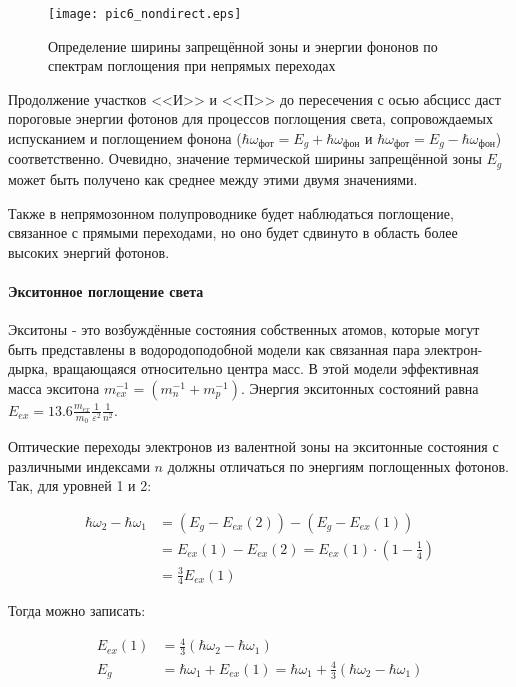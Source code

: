 \begin{figure}[h!]\centering
\texttt{[image: pic6\_nondirect.eps]}
\caption{Определение ширины запрещённой зоны и энергии фононов по спектрам поглощения при непрямых переходах}
\label{pic6_nondirect}
\end{figure}

Продолжение участков <<И>> и <<П>> до пересечения с осью абсцисс даст пороговые энергии фотонов для процессов поглощения света, сопровождаемых испусканием и поглощением фонона ($\hbar \omega_{\text{фот}} = E_{g} + \hbar \omega_{\text{фон}}$ и $\hbar \omega_{\text{фот}} = E_{g} - \hbar \omega_{\text{фон}}$) соответственно. Очевидно, значение термической ширины запрещённой зоны $E_{g}$ может быть получено как среднее между этими двумя значениями.

Также в непрямозонном полупроводнике будет наблюдаться поглощение, связанное с прямыми переходами, но оно будет сдвинуто в область более высоких энергий фотонов.

\paragraph{Экситонное поглощение света}
Экситоны - это возбуждённые состояния собственных атомов, которые могут быть представлены в водородоподобной модели как связанная пара электрон-дырка, вращающаяся относительно центра масс. В этой модели эффективная масса экситона $m_{ex}^{-1} = (m_{n}^{-1} + m_{p}^{-1})$. Энергия экситонных состояний равна $E_{ex} = 13.6 \frac{m_{ex}}{m_{0}} \frac{1}{\varepsilon^2} \frac{1}{n^2}$.

Оптические переходы электронов из валентной зоны на экситонные состояния с различными индексами $n$ должны отличаться по энергиям поглощенных фотонов. Так, для уровней 1 и 2:

\begin{equation}
\begin{split}
\hbar \omega_{2} - \hbar \omega_{1} &= \left( E_{g} - E_{ex}(2) \right) - \left( E_{g} - E_{ex}(1) \right) \\
&= E_{ex}(1) -  E_{ex}(2) =  E_{ex}(1) \cdot \left( 1 - \frac{1}{4} \right) \\
&= \frac{3}{4} E_{ex}(1)
\end{split}
\end{equation}

Тогда можно записать:

\begin{equation}
\begin{split}
E_{ex}(1) &= \frac{4}{3} (\hbar \omega_{2} - \hbar \omega_{1}) \\
E_{g} &= \hbar \omega_{1} + E_{ex}(1) = \hbar \omega_{1} + \frac{4}{3} (\hbar \omega_{2} - \hbar \omega_{1})
\end{split}
\end{equation}

